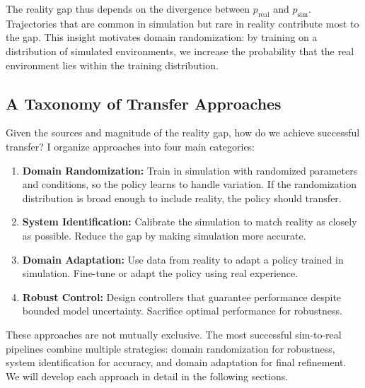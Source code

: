The reality gap thus depends on the divergence between $p_{\text{real}}$ and $p_{\text{sim}}$. Trajectories that are common in simulation but rare in reality contribute most to the gap. This insight motivates domain randomization: by training on a distribution of simulated environments, we increase the probability that the real environment lies within the training distribution.


\subsection{A Taxonomy of Transfer Approaches}

Given the sources and magnitude of the reality gap, how do we achieve successful transfer? I organize approaches into four main categories:

\begin{enumerate}
    \item \textbf{Domain Randomization:} Train in simulation with randomized parameters and conditions, so the policy learns to handle variation. If the randomization distribution is broad enough to include reality, the policy should transfer.

    \item \textbf{System Identification:} Calibrate the simulation to match reality as closely as possible. Reduce the gap by making simulation more accurate.

    \item \textbf{Domain Adaptation:} Use data from reality to adapt a policy trained in simulation. Fine-tune or adapt the policy using real experience.

    \item \textbf{Robust Control:} Design controllers that guarantee performance despite bounded model uncertainty. Sacrifice optimal performance for robustness.
\end{enumerate}

These approaches are not mutually exclusive. The most successful sim-to-real pipelines combine multiple strategies: domain randomization for robustness, system identification for accuracy, and domain adaptation for final refinement. We will develop each approach in detail in the following sections.

